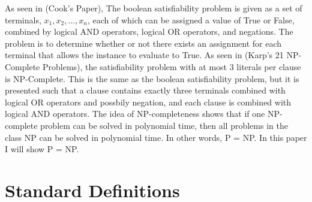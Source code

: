 \documentclass[manuscript]{acmart}
\begin{document}
        As seen in (Cook's Paper),
        The boolean satisfiability problem is given as a set of terminals, $x_1, x_2, ..., x_n$,
        each of which can be assigned a value of True or False,
        combined by logical AND operators, logical OR operators, and negations.
        The problem is to determine whether or not there exists an assignment
        for each terminal that allows the instance to evaluate to True.
        As seen in (Karp's 21 NP-Complete Problems), the satisfiability problem
        with at most 3 literals per clause is NP-Complete. This is the same 
        as the boolean satisfiability problem, but it is presented such that
        a clause contains exactly three terminals combined with logical OR operators
        and possbily negation, and each clause is combined with logical AND operators.
        The idea of NP-completeness shows that if one NP-complete problem can be solved
        in polynomial time, then all problems in the class NP can be solved in polynomial time.
        In other words, P = NP. In this paper I will show P = NP.
        
    \section{Standard Definitions}
\end{document}
